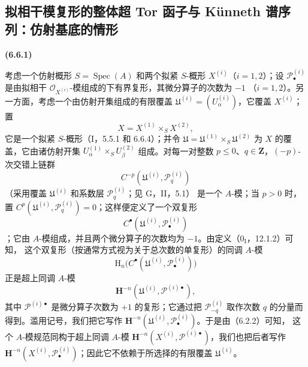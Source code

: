 \documentclass[UTF8,fontset=none,11pt,oneside,openany]{ctexbook}
\newenvironment{env}[1][]{%
  \par\medskip\noindent\textbf{(#1)}\ %
}{\par}
\let\EGAOriginalLabel\label
\renewcommand{\label}[1]{\phantomsection\EGAOriginalLabel{#1}}
\begin{document}
\subsection{拟相干模复形的整体超 Tor 函子与 Künneth 谱序列：仿射基底的情形}
\label{subsection:III.6.6.fr}

\begin{env}[6.6.1]
考虑一个仿射概形 $S=\operatorname{Spec}(A)$ 和两个拟紧 $S$-概形
$X^{(i)}$（$i=1,2$）；设 $\mathscr P_\bullet^{(i)}$ 是由拟相干
$\mathscr O_{X^{(i)}}$-模组成的下有界复形，其微分算子的次数为 $-1$
（$i=1,2$）。另一方面，考虑一个由仿射开集组成的有限覆盖
$\mathfrak U^{(i)}=(U_\alpha^{(i)})$，它覆盖 $X^{(i)}$；置
\[
  X=X^{(1)}\times_S X^{(2)},
\]
它是一个拟紧 $S$-概形（I，5.5.1 和 6.6.4）；并令
$\mathfrak U=\mathfrak U^{(1)}\times_S\mathfrak U^{(2)}$ 为 $X$ 的覆盖，它由诸仿射开集
$U_\alpha^{(1)}\times_S U_\beta^{(2)}$ 组成。对每一对整数
$p\leqslant0$、$q\in\mathbf Z$，$(-p)$-次交错上链群
\[
  C^{-p}(\mathfrak U^{(i)},\mathscr P_q^{(i)})
\]
（采用覆盖 $\mathfrak U^{(i)}$ 和系数层 $\mathscr P_q^{(i)}$；见 G，II，5.1）
是一个 $A$-模；当 $p>0$ 时，置
$C^p(\mathfrak U^{(i)},\mathscr P_q^{(i)})=0$；这样便定义了一个双复形
\[
  C^\bullet(\mathfrak U^{(i)},\mathscr P_\bullet^{(i)})
\]
；它由 $A$-模组成，并且两个微分算子的次数均为 $-1$。由定义（$0_{\mathrm I}$，12.1.2）可知，
这个双复形（按通常方式视为关于总次数的单复形）的同调 $A$-模
\[
  \mathrm H_n\bigl(C^\bullet
  (\mathfrak U^{(i)},\mathscr P_\bullet^{(i)})\bigr)
\]
正是超上同调 $A$-模
\[
  \mathbf H^{-n}
  (\mathfrak U^{(i)},\mathscr P^{(i)\bullet}),
\]
其中 $\mathscr P^{(i)\bullet}$ 是微分算子次数为 $+1$ 的复形；它通过把
$\mathscr P_{-q}^{(i)}$ 取作次数 $q$ 的分量而得到。滥用记号，我们把它写作
$\mathbf H^{-n}(\mathfrak U^{(i)},\mathscr P_\bullet^{(i)})$。于是由（6.2.2）可知，
这个 $A$-模规范同构于超上同调 $A$-模
$\mathbf H^{-n}(X^{(i)},\mathscr P^{(i)\bullet})$，我们也把后者写作
$\mathbf H^{-n}(X^{(i)},\mathscr P_\bullet^{(i)})$；因此它不依赖于所选择的有限覆盖
$\mathfrak U^{(i)}$。
\end{env}
\end{document}
